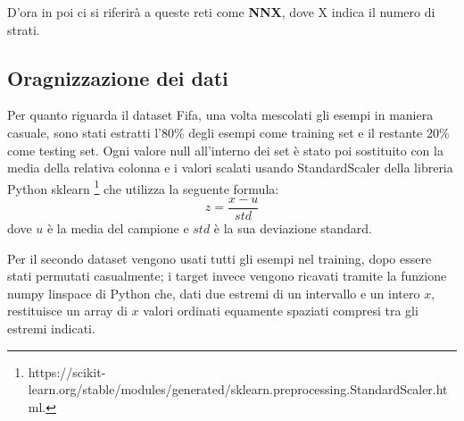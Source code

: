 \documentclass[12pt]{report}
\begin{document}
D'ora in poi ci si riferirà a queste reti come \textbf{NNX}, dove X indica il numero di strati.

\subsection{Oragnizzazione dei dati}
Per quanto riguarda il dataset Fifa, una volta mescolati gli esempi in maniera casuale, sono stati estratti l'80\% degli esempi come training set e il restante 20\% come testing set. Ogni valore null all’interno dei set è stato poi sostituito con la media della relativa colonna e i valori scalati usando StandardScaler della libreria Python sklearn \footnote{https://scikit-learn.org/stable/modules/generated/sklearn.preprocessing.StandardScaler.html.} che utilizza la seguente formula:
\begin{equation}
z = \frac{x - u}{std}
\label{standardscaler}
\end{equation}
dove $u$ è la media del campione e $std$ è la sua deviazione standard.

Per il secondo dataset vengono usati tutti gli esempi nel training, dopo essere stati permutati casualmente; i target invece vengono ricavati tramite la funzione numpy linspace di Python che, dati due estremi di un intervallo e un intero $x$, restituisce un array di $x$ valori ordinati equamente spaziati compresi tra gli estremi indicati.
\end{document}
